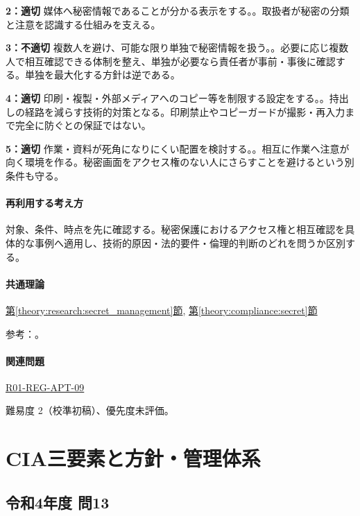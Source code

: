 \noindent\textbf{2：適切} 媒体へ秘密情報であることが分かる表示をする。。取扱者が秘密の分類と注意を認識する仕組みを支える。\par

\noindent\textbf{3：不適切} 複数人を避け、可能な限り単独で秘密情報を扱う。。必要に応じ複数人で相互確認できる体制を整え、単独が必要なら責任者が事前・事後に確認する。単独を最大化する方針は逆である。\par

\noindent\textbf{4：適切} 印刷・複製・外部メディアへのコピー等を制限する設定をする。。持出しの経路を減らす技術的対策となる。印刷禁止やコピーガードが撮影・再入力まで完全に防ぐとの保証ではない。\par

\noindent\textbf{5：適切} 作業・資料が死角になりにくい配置を検討する。。相互に作業へ注意が向く環境を作る。秘密画面をアクセス権のない人にさらすことを避けるという別条件も守る。\par

\paragraph{再利用する考え方} 対象、条件、時点を先に確認する。秘密保護におけるアクセス権と相互確認を具体的な事例へ適用し、技術的原因・法的要件・倫理的判断のどれを問うか区別する。

\paragraph{共通理論} \hyperref[theory:research:secret_management]{第\ref*{theory:research:secret_management}節}, \hyperref[theory:compliance:secret]{第\ref*{theory:compliance:secret}節}

\par 参考：\cite{meti_secret_handbook2024}。

\paragraph{関連問題} \hyperref[q:r01-reg-apt-09]{R01-REG-APT-09}

\par 難易度 2（校準初稿）、優先度未評価。

\section{CIA三要素と方針・管理体系}

\subsection{令和4年度 問13}
\label{q:r04-reg-apt-13}

